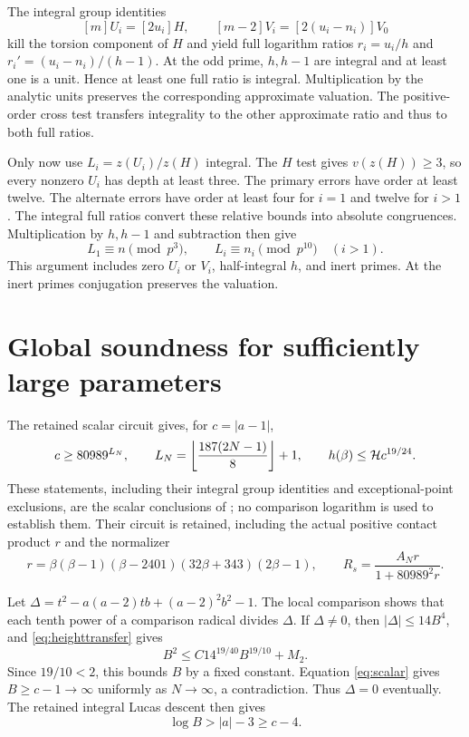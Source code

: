 \documentclass[11pt,a4paper]{article}
\begin{document}
The integral group identities
\[
 [m]U_i=[2u_i]H,\qquad
 [m-2]V_i=[2(u_i-n_i)]V_0
\]
kill the torsion component of $H$ and yield full logarithm ratios
$r_i=u_i/h$ and $r_i'=(u_i-n_i)/(h-1)$.
At the odd prime, $h,h-1$ are integral and at least one is a unit.
Hence at least one full ratio is integral. Multiplication by the
analytic units preserves the corresponding approximate valuation.
The positive-order cross test transfers integrality to the other
approximate ratio and thus to both full ratios.

Only now use $L_i=z(U_i)/z(H)$ integral. The $H$ test gives
$v(z(H))\ge3$, so every nonzero $U_i$ has depth at least three.
The primary errors have order at least twelve. The alternate errors
have order at least four for $i=1$ and twelve for $i>1$.
The integral full ratios convert these relative bounds into absolute
congruences. Multiplication by $h,h-1$ and subtraction then give
\[
 L_1\equiv n\pmod{p^3},\qquad
 L_i\equiv n_i\pmod{p^{10}}\quad(i>1).
\]
This argument includes zero $U_i$ or $V_i$, half-integral $h$, and
inert primes. At the inert primes conjugation preserves the valuation.

\section{Global soundness for sufficiently large parameters}\label{sec:soundness}
The retained scalar circuit gives, for $c=|a-1|$,
\begin{equation}\label{eq:scalar}
 c\ge80989^{L_N},\qquad
 L_N=\left\lfloor\frac{187(2N-1)}8\right\rfloor+1,
 \qquad h(\beta)\le\mathcal H c^{19/24}.
\end{equation}
These statements, including their integral group identities and
exceptional-point exclusions, are the scalar conclusions of
\cite{Source}; no comparison logarithm is used to establish them.
Their circuit is retained, including the actual positive contact
product $r$ and the normalizer
\[
 r=\beta(\beta-1)(\beta-2401)(32\beta+343)(2\beta-1),
 \qquad R_s=\frac{A_Nr}{1+80989^2r}.
\]

Let
$\Delta=t^2-a(a-2)tb+(a-2)^2b^2-1$.
The local comparison shows that each tenth power of a comparison
radical divides $\Delta$. If $\Delta\ne0$, then
$|\Delta|\le14B^4$, and \eqref{eq:heighttransfer} gives
\[
                  B^2\le C14^{19/40}B^{19/10}+M_2.
\]
Since $19/10<2$, this bounds $B$ by a fixed constant. Equation
\eqref{eq:scalar} gives $B\ge c-1\to\infty$ uniformly as
$N\to\infty$, a contradiction. Thus $\Delta=0$ eventually.
The retained integral Lucas descent then gives
\[
                         \log B>|a|-3\ge c-4.
\]
\end{document}
